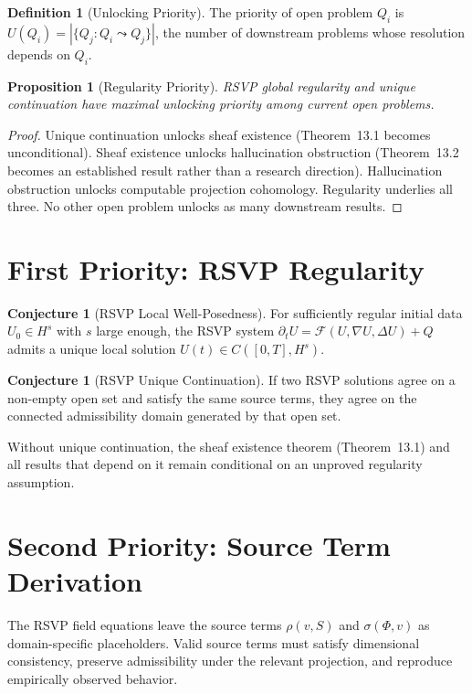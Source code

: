 \documentclass[12pt, oneside]{book}
\theoremstyle{flyxion}
\newtheorem{proposition}[theorem]{Proposition}
\theoremstyle{definition}
\newtheorem{definition}[theorem]{Definition}
\newtheorem{conjecture}[theorem]{Conjecture}
\begin{document}
\begin{definition}[Unlocking Priority]
The priority of open problem $Q_i$ is
$U(Q_i) = |\{Q_j : Q_i \leadsto Q_j\}|$, the number
of downstream problems whose resolution depends on
$Q_i$.
\end{definition}

\begin{proposition}[Regularity Priority]
RSVP global regularity and unique continuation have
maximal unlocking priority among current open problems.
\end{proposition}

\begin{proof}
Unique continuation unlocks sheaf existence
(Theorem~13.1 becomes unconditional). Sheaf existence
unlocks hallucination obstruction (Theorem~13.2 becomes
an established result rather than a research direction).
Hallucination obstruction unlocks computable projection
cohomology. Regularity underlies all three. No other
open problem unlocks as many downstream results.
\end{proof}

\section{First Priority: RSVP Regularity}

\begin{conjecture}[RSVP Local Well-Posedness]
For sufficiently regular initial data $U_0 \in H^s$
with $s$ large enough, the RSVP system
$\partial_t U = \mathcal{F}(U, \nabla U, \Delta U) + Q$
admits a unique local solution $U(t) \in C([0,T], H^s)$.
\end{conjecture}

\begin{conjecture}[RSVP Unique Continuation]
If two RSVP solutions agree on a non-empty open set
and satisfy the same source terms, they agree on the
connected admissibility domain generated by that open
set.
\end{conjecture}

Without unique continuation, the sheaf existence
theorem (Theorem~13.1) and all results that depend on
it remain conditional on an unproved regularity
assumption.

\section{Second Priority: Source Term Derivation}

The RSVP field equations leave the source terms
$\rho(v, S)$ and $\sigma(\Phi, v)$ as domain-specific
placeholders. Valid source terms must satisfy
dimensional consistency, preserve admissibility under
the relevant projection, and reproduce empirically
observed behavior.
\end{document}
